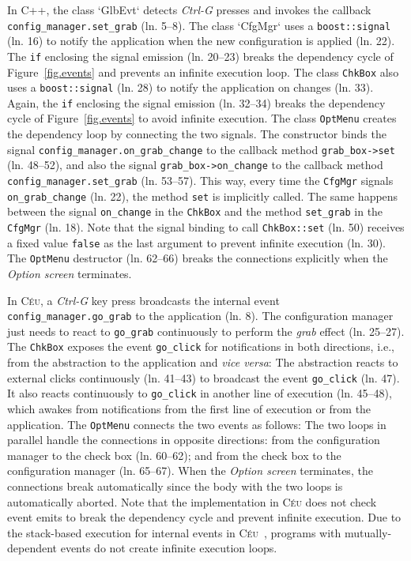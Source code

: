 \documentclass{vgtc}                          %
\newcommand{\CEU}{\textsc{C\'{e}u}\xspace}
\newcommand{\code}[1] {{\small{\texttt{#1}}}}
\begin{document}
In C++, the class `GlbEvt` detects \emph{Ctrl-G} presses and invokes the
callback \code{config\_manager.set\_grab} (ln. 5--8).
%
The class `CfgMgr` uses a \code{boost::signal} (ln. 16) to notify the
application when the new configuration is applied (ln. 22).
%
The \code{if} enclosing the signal emission (ln. 20--23) breaks the dependency 
cycle of Figure~\ref{fig.events} and prevents an infinite execution loop.
%
The class \code{ChkBox} also uses a \code{boost::signal} (ln. 28) to notify
the application on changes (ln. 33).
%
Again, the \code{if} enclosing the signal emission (ln. 32--34) breaks the 
dependency cycle of Figure~\ref{fig.events} to avoid infinite execution.
%
The class \code{OptMenu} creates the dependency loop by connecting the two
signals.
%
The constructor binds
the signal \code{config\_manager.on\_grab\_change} to the callback
    method \code{grab\_box->set} (ln. 48--52),
and also
the signal \code{grab\_box->on\_change} to the callback method
    \code{config\_manager.set\_grab} (ln. 53--57).
This way, every time the \code{CfgMgr} signals
\code{on\_grab\_change} (ln. 22), the method \code{set} is implicitly called.
The same happens between the signal \code{on\_change} in the \code{ChkBox}
and the method \code{set\_grab} in the \code{CfgMgr} (ln. 18).
%
Note that the signal binding to call \code{ChkBox::set} (ln. 50) receives a
fixed value \code{false} as the last argument to prevent infinite execution
(ln. 30).
%
The \code{OptMenu} destructor (ln. 62--66) breaks the connections explicitly
when the \emph{Option screen} terminates.

In \CEU, a \emph{Ctrl-G} key press broadcasts the internal event
\code{config\_manager.go\_grab} to the application (ln. 8).
%
The configuration manager just needs to react to \code{go\_grab}
continuously to perform the \emph{grab} effect (ln. 25--27).
%
The \code{ChkBox} exposes the event \code{go\_click} for notifications in
both directions, i.e., from the abstraction to the application and
\emph{vice versa}:
%
The abstraction reacts to external clicks continuously (ln. 41--43) to
broadcast the event \code{go\_click} (ln. 47).
It also reacts continuously to \code{go\_click} in another line of execution
(ln. 45--48), which awakes from notifications from the first line of execution
or from the application.
%
The \code{OptMenu} connects the two events as follows:
%
The two loops in parallel handle the connections in opposite directions:
from the configuration manager to the check box (ln. 60--62);
and
from the check box to the configuration manager (ln. 65--67).
%
When the \emph{Option screen} terminates, the connections break automatically
since the body with the two loops is automatically aborted.
%
Note that the implementation in \CEU does not check event emits to break the
dependency cycle and prevent infinite execution.
Due to the stack-based execution for internal events in
\CEU~\cite{ceu.sensys13)}, programs with mutually-dependent events do not
create infinite execution loops.
\end{document}
